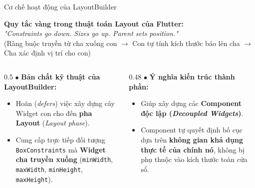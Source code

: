 \documentclass[aspectratio=169, 10pt]{beamer}
\begin{document}
\begin{frame}{Cơ chế hoạt động của LayoutBuilder}
  \vspace{-0.1cm}
  \begin{center}
    \textbf{\normalsize\color{blue!80!black}Quy tắc vàng trong thuật toán Layout của Flutter:}\\
    \textit{"Constraints go down. Sizes go up. Parent sets position."}\\
    \small(Ràng buộc truyền từ cha xuống con $\longrightarrow$ Con tự tính kích thước báo lên cha $\longrightarrow$ Cha xác định vị trí cho con)
  \end{center}

  \vspace{0.15cm}
  \begin{columns}[T]
    \begin{column}{0.5\textwidth}
      \small
      $\bullet$ \textbf{Bản chất kỹ thuật của LayoutBuilder:}
      \begin{itemize}\setlength{\itemsep}{3pt}
        \item Hoãn (\textit{defers}) việc xây dựng cây Widget con cho đến \textbf{pha Layout} (\textit{Layout phase}).
        \item Cung cấp trực tiếp đối tượng \texttt{BoxConstraints} mà \textbf{Widget cha truyền xuống} (\texttt{minWidth}, \texttt{maxWidth}, \texttt{minHeight}, \texttt{maxHeight}).
      \end{itemize}
    \end{column}

    \begin{column}{0.48\textwidth}
      \small
      $\bullet$ \textbf{Ý nghĩa kiến trúc thành phần:}
      \begin{itemize}\setlength{\itemsep}{3pt}
        \item Giúp xây dựng các \textbf{Component độc lập (\textit{Decoupled Widgets})}.
        \item Component tự quyết định bố cục dựa trên \textbf{không gian khả dụng thực tế của chính nó}, không bị phụ thuộc vào kích thước toàn cửa sổ.
      \end{itemize}
    \end{column}
  \end{columns}

  \vspace{0.25cm}
  \centering
\end{frame}
\end{document}
